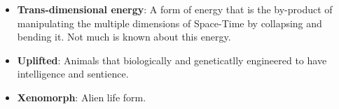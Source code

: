 \documentclass[10pt,twoside]{article}
\begin{document}
\begin{multicols}{2}
\begin{itemize}
\item \textbf{Trans-dimensional energy}: A form of energy that is the by-product of manipulating the multiple dimensions of Space-Time by collapsing and bending it. Not much is known about this energy.

\item \textbf{Uplifted}: Animals that biologically and geneticatlly engineered to have intelligence and sentience.

\item \textbf{Xenomorph}: Alien life form.

\end{itemize}

\end{multicols}

\end{document}
